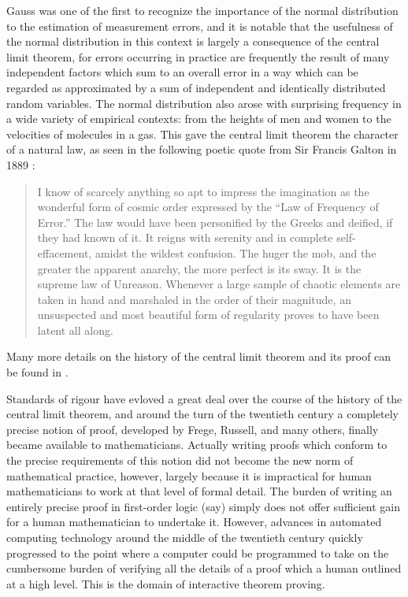 \documentclass{article}
\theoremstyle{definition}
\begin{document}
Gauss was one of the first to recognize the importance of the normal distribution to the estimation of measurement errors, and it is notable that the usefulness of the normal distribution in this context is largely a consequence of the central limit theorem, for errors occurring in practice are frequently the result of many independent factors which sum to an overall error in a way which can be regarded as approximated by a sum of independent and identically distributed random variables. The normal distribution also arose with surprising frequency in a wide variety of empirical contexts: from the heights of men and women to the velocities of molecules in a gas. This gave the central limit theorem the character of a natural law, as seen in the following poetic quote from Sir Francis Galton in 1889 \cite{galton}:
\begin{quote}
 I know of scarcely anything so apt to impress the imagination as the wonderful form of cosmic order expressed by the ``Law of Frequency of Error.'' The law would have been personified by the Greeks and deified, if they had known of it. It reigns with serenity and in complete self-effacement, amidst the wildest confusion. The huger the mob, and the greater the apparent anarchy, the more perfect is its sway. It is the supreme law of Unreason. Whenever a large sample of chaotic elements are taken in hand and marshaled in the order of their magnitude, an unsuspected and most beautiful form of regularity proves to have been latent all along.
\end{quote}
Many more details on the history of the central limit theorem and its proof can be found in \cite{fischer}.

Standards of rigour have evloved a great deal over the course of the history of the central limit theorem, and around the turn of the twentieth century a completely precise notion of proof, developed by Frege, Russell, and many others, finally became available to mathematicians. Actually writing proofs which conform to the precise requirements of this notion did not become the new norm of mathematical practice, however, largely because it is impractical for human mathematicians to work at that level of formal detail. The burden of writing an entirely precise proof in first-order logic (say) simply does not offer sufficient gain for a human mathematician to undertake it. However, advances in automated computing technology around the middle of the twentieth century quickly progressed to the point where a computer could be programmed to take on the cumbersome burden of verifying all the details of a proof which a human outlined at a high level. This is the domain of interactive theorem proving.
\end{document}
